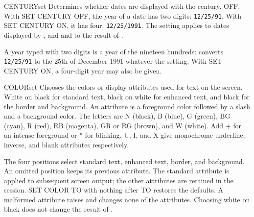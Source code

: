 \begin{XbaseEntry}{CENTURY}{set}
Determines whether dates are displayed with the century.
\Syntax
{}
\Defaults
OFF.
\Usage
With SET CENTURY OFF, the year of a date has two digits: \texttt{12/25/91}.
With SET CENTURY ON, it has four: \texttt{12/25/1991}.  The setting applies to
dates displayed by ,  and  and to the result of
.

A year typed with two digits is a year of the nineteen hundreds:
 converts \texttt{12/25/91} to the 25th of December 1991 whatever the
setting.  With SET CENTURY ON, a four-digit year may also be given.
\Examples
{}
\end{XbaseEntry}

\begin{XbaseEntry}{COLOR}{set}
Chooses the colors or display attributes used for text on the screen.
\Syntax
{}
\Defaults
White on black for standard text, black on white for enhanced text, and black
for the border and background.
\Usage
An attribute is a foreground color followed by a slash and a background color.
The letters are N (black), B (blue), G (green), BG (cyan), R (red), RB
(magenta), GR or RG (brown), and W (white). Add + for an intense foreground
or * for blinking. U, I, and X give monochrome underline, inverse, and blank
attributes respectively.

The four positions select standard text, enhanced text, border, and background.
An omitted position keeps its previous attribute. The standard attribute is
applied to subsequent screen output; the other attributes are retained in the
session. SET COLOR TO with nothing after TO restores the defaults. A malformed
attribute raises  and changes none of the attributes.
Choosing white on black does not change the result of .
\Examples
{}
\end{XbaseEntry}

